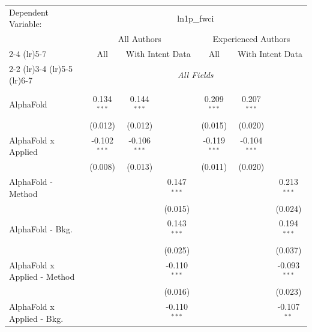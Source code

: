 \begingroup
\centering
\begin{tabular}{lcccccc}
   \tabularnewline \midrule \midrule
   Dependent Variable: & \multicolumn{6}{c}{ln1p\_fwci}\\
 & \multicolumn{3}{c}{All Authors} & \multicolumn{3}{c}{Experienced Authors} \\
\cmidrule(lr){2-4} \cmidrule(lr){5-7}
 & \multicolumn{1}{c}{All} & \multicolumn{2}{c}{With Intent Data} & \multicolumn{1}{c}{All} & \multicolumn{2}{c}{With Intent Data} \\
\cmidrule(lr){2-2} \cmidrule(lr){3-4} \cmidrule(lr){5-5} \cmidrule(lr){6-7}
 & \multicolumn{6}{c}{\textit{All Fields}} \\ \\
   AlphaFold                      & 0.134$^{***}$  & 0.144$^{***}$  &                & 0.209$^{***}$  & 0.207$^{***}$  &   \\   
                                  & (0.012)        & (0.012)        &                & (0.015)        & (0.020)        &   \\   
   AlphaFold x Applied            & -0.102$^{***}$ & -0.106$^{***}$ &                & -0.119$^{***}$ & -0.104$^{***}$ &   \\   
                                  & (0.008)        & (0.013)        &                & (0.011)        & (0.020)        &   \\   
   AlphaFold - Method             &                &                & 0.147$^{***}$  &                &                & 0.213$^{***}$\\   
                                  &                &                & (0.015)        &                &                & (0.024)\\   
   AlphaFold - Bkg.               &                &                & 0.143$^{***}$  &                &                & 0.194$^{***}$\\   
                                  &                &                & (0.025)        &                &                & (0.037)\\   
   AlphaFold x Applied - Method   &                &                & -0.110$^{***}$ &                &                & -0.093$^{***}$\\   
                                  &                &                & (0.016)        &                &                & (0.023)\\   
   AlphaFold x Applied - Bkg.     &                &                & -0.110$^{***}$ &                &                & -0.107$^{**}$\\   

\end{tabular}
